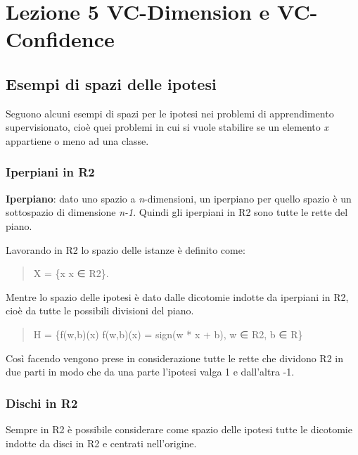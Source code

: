 \section{Lezione 5 VC-Dimension e VC-Confidence}\label{lezione-5-vc-dimension-e-vc-confidence}

\subsection{Esempi di spazi delle ipotesi}\label{esempi-di-spazi-delle-ipotesi}

Seguono alcuni esempi di spazi per le ipotesi nei problemi di
apprendimento supervisionato, cioè quei problemi in cui si vuole
stabilire se un elemento \emph{x} appartiene o meno ad una classe.

\subsubsection{Iperpiani in R2}\label{iperpiani-in-r2}

\textbf{Iperpiano}: dato uno spazio a \emph{n}-dimensioni, un iperpiano
per quello spazio è un sottospazio di dimensione \emph{n-1}. Quindi gli
iperpiani in R2 sono tutte le rette del piano.

Lavorando in R2 lo spazio delle istanze è definito come:

\begin{quote}
X = \{x \textbar{} x ∈ R2\}.
\end{quote}

Mentre lo spazio delle ipotesi è dato dalle dicotomie indotte da
iperpiani in R2, cioè da tutte le possibili divisioni del piano.

\begin{quote}
H = \{f(w,b)(x) \textbar{} f(w,b)(x) = sign(w * x + b), w ∈ R2, b ∈ R\}
\end{quote}

Così facendo vengono prese in considerazione tutte le rette che dividono
R2 in due parti in modo che da una parte l'ipotesi valga 1 e dall'altra
-1.

\subsubsection{Dischi in R2}\label{dischi-in-r2}

Sempre in R2 è possibile considerare come spazio delle ipotesi tutte le
dicotomie indotte da disci in R2 e centrati nell'origine.

